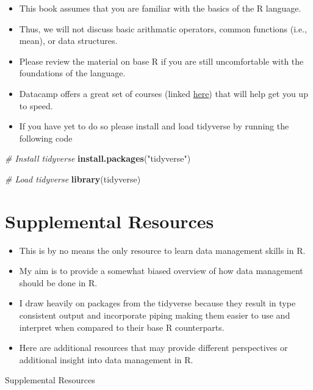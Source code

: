 \documentclass[]{book}
\newenvironment{Shaded}{\begin{snugshade}}{\end{snugshade}}
\newcommand{\CommentTok}[1]{\textcolor[rgb]{0.56,0.35,0.01}{\textit{#1}}}
\newcommand{\KeywordTok}[1]{\textcolor[rgb]{0.13,0.29,0.53}{\textbf{#1}}}
\newcommand{\NormalTok}[1]{#1}
\newcommand{\StringTok}[1]{\textcolor[rgb]{0.31,0.60,0.02}{#1}}
\providecommand{\tightlist}{%
  \setlength{\itemsep}{0pt}\setlength{\parskip}{0pt}}
\theoremstyle{definition}
\theoremstyle{definition}
\theoremstyle{definition}
\theoremstyle{remark}
\begin{document}
\begin{itemize}
\item
  This book assumes that you are familiar with the basics of the R language.
\item
  Thus, we will not discuss basic arithmatic operators, common functions (i.e., mean), or data structures.
\item
  Please review the material on base R if you are still uncomfortable with the foundations of the language.
\item
  Datacamp offers a great set of courses (linked \href{https://www.datacamp.com/courses/free-introduction-to-r}{here}) that will help get you up to speed.
\item
  If you have yet to do so please install and load tidyverse by running the following code
\end{itemize}

\begin{Shaded}
\begin{Highlighting}[]
\CommentTok{# Install tidyverse}
\KeywordTok{install.packages}\NormalTok{(}\StringTok{"tidyverse"}\NormalTok{)}

\CommentTok{# Load tidyverse}
\KeywordTok{library}\NormalTok{(tidyverse)}
\end{Highlighting}
\end{Shaded}

\hypertarget{supplemental-resources}{%
\section{Supplemental Resources}\label{supplemental-resources}}

\begin{itemize}
\tightlist
\item
  This is by no means the only resource to learn data management skills in R.
\item
  My aim is to provide a somewhat biased overview of how data management should be done in R.
\item
  I draw heavily on packages from the tidyverse because they result in type consistent output and incorporate piping making them easier to use and interpret when compared to their base R counterparts.
\item
  Here are additional resources that may provide different perspectives or additional insight into data management in R.
\end{itemize}

Supplemental Resources
\end{document}
